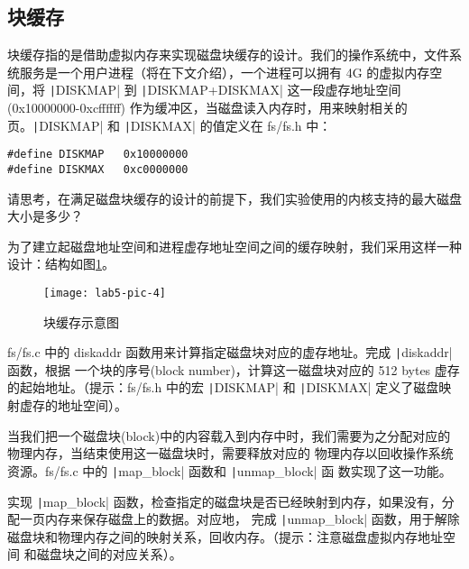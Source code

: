 \subsection{块缓存}

块缓存指的是借助虚拟内存来实现磁盘块缓存的设计。我们的操作系统中，文件系统服务是一个用户进程（将在下文介绍），一个进程可以拥有 4G 
的虚拟内存空间，将 \texttt|DISKMAP| 到 \texttt|DISKMAP+DISKMAX| 这一段虚存地址空间
(0x10000000-0xcffffff) 作为缓冲区，当磁盘读入内存时，用来映射相关的页。\texttt|DISKMAP| 和
\texttt|DISKMAX| 的值定义在 fs/fs.h 中：

\begin{verbatim}
#define DISKMAP   0x10000000
#define DISKMAX   0xc0000000
\end{verbatim}

\begin{thinking}\label{think-disksize}
请思考，在满足磁盘块缓存的设计的前提下，我们实验使用的内核支持的最大磁盘大小是多少？
\end{thinking}

为了建立起磁盘地址空间和进程虚存地址空间之间的缓存映射，我们采用这样一种设计：结构如图\ref{lab5-pic-4}。

\begin{figure}[htbp]
  \centering
  \texttt{[image: lab5-pic-4]}
  \caption{块缓存示意图}\label{lab5-pic-4}
\end{figure}

\begin{exercise}
fs/fs.c 中的 diskaddr 函数用来计算指定磁盘块对应的虚存地址。完成 \texttt|diskaddr| 函数，根据
一个块的序号(block number)，计算这一磁盘块对应的 512 bytes 虚存的起始地址。（提示：fs/fs.h 中的宏
\texttt|DISKMAP| 和 \texttt|DISKMAX| 定义了磁盘映射虚存的地址空间）。
\end{exercise}

当我们把一个磁盘块(block)中的内容载入到内存中时，我们需要为之分配对应的物理内存，当结束使用这一磁盘块时，需要释放对应的
物理内存以回收操作系统资源。fs/fs.c 中的 \texttt|map_block| 函数和 \texttt|unmap_block| 函
数实现了这一功能。

\begin{exercise}
实现 \texttt|map_block| 函数，检查指定的磁盘块是否已经映射到内存，如果没有，分配一页内存来保存磁盘上的数据。对应地，
完成 \texttt|unmap_block| 函数，用于解除磁盘块和物理内存之间的映射关系，回收内存。（提示：注意磁盘虚拟内存地址空间
和磁盘块之间的对应关系）。
\end{exercise}

